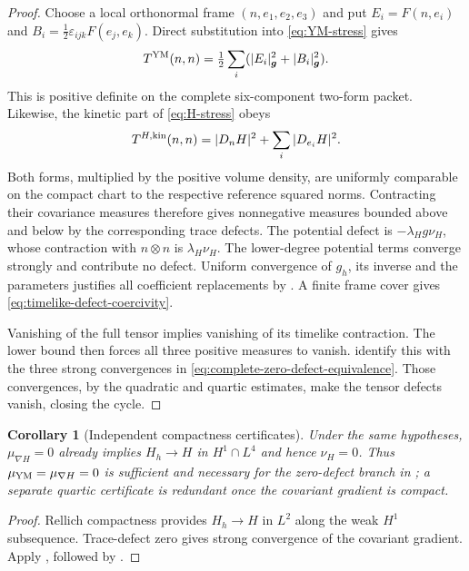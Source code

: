 \documentclass[11pt]{article}
\numberwithin{equation}{section}
\newtheorem{corollary}[corollary]{Corollary}
\theoremstyle{definition}
\theoremstyle{remark}
\begin{document}
\begin{proof}
Choose a local orthonormal frame $(n,e_1,e_2,e_3)$ and put
$E_i=F(n,e_i)$ and $B_i=\frac12\varepsilon_{ijk}F(e_j,e_k)$.
Direct substitution into \eqref{eq:YM-stress} gives
\begin{equation}
 T^{\rm YM}(n,n)=\tfrac12\sum_i
 (|E_i|_{\boldsymbol g}^2+|B_i|_{\boldsymbol g}^2).
 \label{eq:YM-timelike-energy}
\end{equation}
This is positive definite on the complete six-component two-form packet.
Likewise, the kinetic part of \eqref{eq:H-stress} obeys
\begin{equation}
 T^{H,\rm kin}(n,n)=|D_nH|^2+\sum_i|D_{e_i}H|^2.
 \label{eq:H-timelike-energy}
\end{equation}
Both forms, multiplied by the positive volume density, are uniformly
comparable on the compact chart to the respective reference squared norms.
Contracting their covariance measures therefore gives nonnegative measures
bounded above and below by the corresponding trace defects.  The potential
defect is $-\lambda_Hg\nu_H$, whose contraction with $n\otimes n$ is
$\lambda_H\nu_H$.  The lower-degree potential terms converge strongly and
contribute no defect.  Uniform convergence of $g_h$, its inverse and the
parameters justifies all coefficient replacements by
.  A finite frame cover gives
\eqref{eq:timelike-defect-coercivity}.

Vanishing of the full tensor implies vanishing of its timelike contraction.
The lower bound then forces all three positive measures to vanish.
 identify this with the
three strong convergences in \eqref{eq:complete-zero-defect-equivalence}.
Those convergences, by the quadratic and quartic estimates, make the tensor
defects vanish, closing the cycle.
\end{proof}

\begin{corollary}[Independent compactness certificates]
\label{cor:independent-bosonic-certificates}
Under the same hypotheses, $\mu_{\nabla H}=0$ already implies
$H_h\to H$ in $H^1\cap L^4$ and hence $\nu_H=0$.
Thus $\mu_{\rm YM}=\mu_{\nabla H}=0$ is sufficient and necessary for the
zero-defect branch in ; a separate
quartic certificate is redundant once the covariant gradient is compact.
\end{corollary}
\begin{proof}
Rellich compactness provides $H_h\to H$ in $L^2$ along the weak $H^1$
subsequence.  Trace-defect zero gives strong convergence of the covariant
gradient.  Apply , followed by
.
\end{proof}
\end{document}

